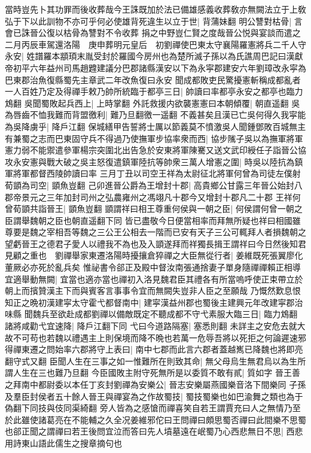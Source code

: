 當時豈先卜其功罪而後收葬哉今王誅既加於法已備雄感義收葬敎亦無闕法立于上敎弘于下以此訓物不亦可乎何必使雄背死違生以立于世|{
	背蒲妹翻}
明公讐對枯骨|{
	言會已誅晉公復以枯骨為讐對不令收葬}
捐之中野豈仁賢之度哉晉公悦與宴談而遣之　二月丙辰車駕還洛陽　庚申葬明元皇后　初劉禪使巴東太守襄陽羅憲將兵二千人守永安|{
	姓譜羅本顓頊末胤受封於羅國今房州也為楚所滅子孫以為氏譙周巴記曰漢獻帝初平六年益州司馬趙韙建議分巴郡諸縣漢安以下為永寜郡建安六年劉璋改永寜為巴東郡治魚復縣蜀先主章武二年改魚復曰永安}
聞成都敗吏民驚擾憲斬稱成都亂者一人百姓乃定及得禪手敕乃帥所統臨于都亭三日|{
	帥讀曰率都亭永安之都亭也臨力鴆翻}
吳聞蜀敗起兵西上|{
	上時掌翻}
外託救援内欲襲憲憲曰本朝傾覆|{
	朝直遥翻}
吳為唇齒不恤我難而背盟徼利|{
	難乃旦翻徼一遥翻}
不義甚矣且漢已亡吳何得久我寜能為吳降虜乎|{
	降戶江翻}
保城繕甲告誓將士厲以節義莫不憤激吳人聞鍾鄧敗百城無主有兼蜀之志而巴東固守兵不得過乃使撫軍步協率衆而西|{
	協步隲子吳以為撫軍將軍}
憲力弱不能禦遣參軍楊宗突圍北出告急於安東將軍陳騫又送文武印綬任子詣晉公協攻永安憲與戰大破之吳主怒復遣鎮軍陸抗等帥衆三萬人增憲之圍|{
	時吳以陸抗為鎮軍將軍都督西陵帥讀曰率}
三月丁丑以司空王祥為太尉征北將軍何曾為司徒左僕射荀顗為司空|{
	顗魚豈翻}
己卯進晉公爵為王增封十郡|{
	高貴鄉公甘露三年晉公始封八郡帝景元之三年加封司州之弘農雍州之馮翊凡十郡今又增封十郡凡二十郡}
王祥何曾荀顗共詣晉王|{
	顗魚豈翻}
顗謂祥曰相王尊重何侯與一朝之臣|{
	何侯謂何曾一朝之臣謂舉魏朝之臣也朝直遥翻下同}
皆已盡敬今日便當相率而拜無所疑也祥曰相國雖尊要是魏之宰相吾等魏之三公王公相去一階而已安有天子三公可輒拜人者損魏朝之望虧晉王之德君子愛人以禮我不為也及入顗遂拜而祥獨長揖王謂祥曰今日然後知君見顧之重也　劉禪舉家東遷洛陽時擾攘倉猝禪之大臣無從行者|{
	姜維既死張翼廖化董厥必亦死於亂兵矣}
惟祕書令郤正及殿中督汝南張通捨妻子單身隨禪禪賴正相導宜適舉動無闕|{
	宜當也適亦當也禪初入洛見魏君臣其禮各有所當嗚呼使正束帶立於朝上而擯贊漢主下而與賓客言事事令宜而無闕失豈非人臣之至願哉}
乃慨然歎息恨知正之晩初漢建寜太守霍弋都督南中|{
	建寜漢益州郡也蜀後主建興元年改建寜郡治味縣}
聞魏兵至欲赴成都劉禪以備敵既定不聽成都不守弋素服大臨三日|{
	臨力鴆翻}
諸將咸勸弋宜速降|{
	降戶江翻下同}
弋曰今道路隔塞|{
	塞悉則翻}
未詳主之安危去就大故不可苟也若魏以禮遇主上則保境而降不晩也若萬一危辱吾將以死拒之何論遲速邪得禪東遷之問始率六郡將守上表曰|{
	南中七郡而此言六郡者蓋越嶲已降魏也將即亮翻守式又翻}
臣聞人生在三事之如一惟難所在則致其命|{
	無父母烏生無君烏以為生所謂人生在三也難乃旦翻}
今臣國敗主附守死無所是以委質不敢有貳|{
	質如字}
晉王善之拜南中都尉委以本任丁亥封劉禪為安樂公|{
	晉志安樂屬燕國樂音洛下間樂同}
子孫及羣臣封侯者五十餘人晉王與禪宴為之作故蜀技|{
	蜀技蜀樂也如巴渝舞之類也為于偽翻下同技與伎同渠綺翻}
旁人皆為之感愴而禪喜笑自若王謂賈充曰人之無情乃至於此雖使諸葛亮在不能輔之久全况姜維邪佗曰王問禪曰頗思蜀否禪曰此間樂不思蜀也郤正聞之謂禪曰若王後問宜泣而答曰先人墳墓遠在岷蜀乃心西悲無日不思|{
	西悲用詩東山語此儒生之搜章摘句也}
